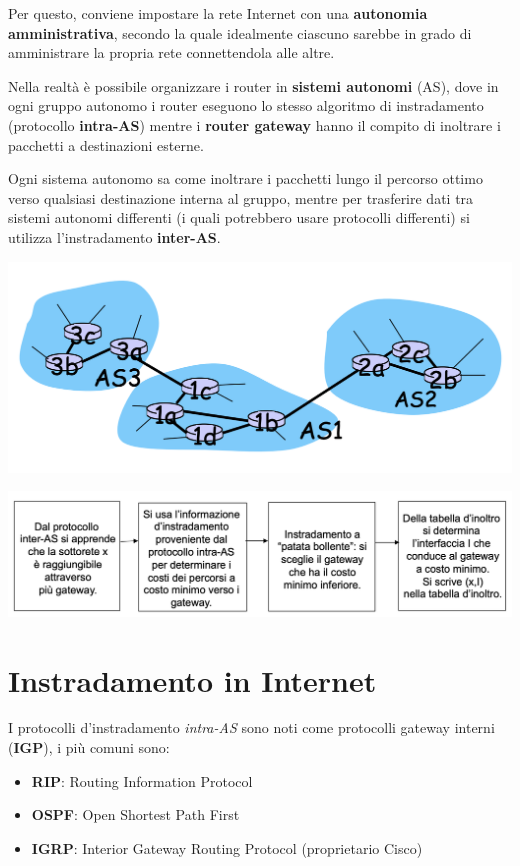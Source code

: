 \documentclass{report}
\begin{document}
Per questo, conviene impostare la rete Internet con una
\textbf{autonomia amministrativa}, secondo la quale idealmente ciascuno
sarebbe in grado di amministrare la propria rete connettendola alle
altre.

Nella realtà è possibile organizzare i router in \textbf{sistemi
autonomi} (AS), dove in ogni gruppo autonomo i router eseguono lo stesso
algoritmo di instradamento (protocollo \textbf{intra-AS}) mentre i
\textbf{router gateway} hanno il compito di inoltrare i pacchetti a
destinazioni esterne.

Ogni sistema autonomo sa come inoltrare i pacchetti lungo il percorso
ottimo verso qualsiasi destinazione interna al gruppo, mentre per
trasferire dati tra sistemi autonomi differenti (i quali potrebbero
usare protocolli differenti) si utilizza l'instradamento
\textbf{inter-AS}.

\begin{center}
		\includegraphics[width=0.7\linewidth]{as}
	\end{center}

\begin{center}
		\includegraphics[width=0.7\linewidth]{routing-as}
	\end{center}

\hypertarget{header-n235}{%
\section{Instradamento in Internet}\label{header-n235}}

I protocolli d'instradamento \emph{intra-AS} sono noti come protocolli
gateway interni (\textbf{IGP}), i più comuni sono:

\begin{itemize}
\item
  \textbf{RIP}: Routing Information Protocol
\item
  \textbf{OSPF}: Open Shortest Path First
\item
  \textbf{IGRP}: Interior Gateway Routing Protocol (proprietario Cisco)
\end{itemize}
\end{document}

